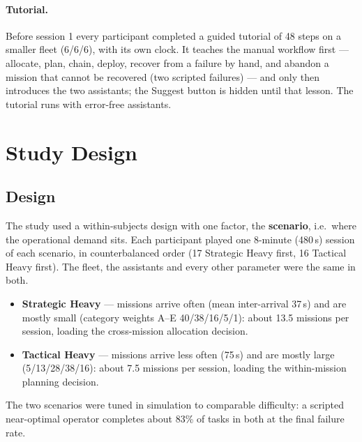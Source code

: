 \documentclass[10pt]{article}
\theoremstyle{definition}
\begin{document}
\paragraph{Tutorial.} Before session 1 every participant completed a guided tutorial of 48 steps on a smaller fleet
(6/6/6), with its own clock. It teaches the manual workflow first --- allocate, plan, chain, deploy, recover from a
failure by hand, and abandon a mission that cannot be recovered (two scripted failures) --- and only then introduces
the two assistants; the Suggest button is hidden until that lesson. The tutorial runs with error-free assistants.

\section{Study Design}\label{sec:studydesign}

\subsection{Design}\label{sec:design}

The study used a within-subjects design with one factor, the \textbf{scenario}, i.e.\ where the operational demand
sits. Each participant played one 8-minute (480\,s) session of each scenario, in counterbalanced order (17
Strategic Heavy first, 16 Tactical Heavy first). The fleet, the assistants and every other parameter were the same in
both.
\begin{itemize}[noitemsep]
  \item \textbf{Strategic Heavy} --- missions arrive often (mean inter-arrival 37\,s) and are mostly small (category
        weights A--E 40/38/16/5/1): about 13.5 missions per session, loading the cross-mission allocation decision.
  \item \textbf{Tactical Heavy} --- missions arrive less often (75\,s) and are mostly large (5/13/28/38/16): about
        7.5 missions per session, loading the within-mission planning decision.
\end{itemize}
The two scenarios were tuned in simulation to comparable difficulty: a scripted near-optimal operator completes about
83\% of tasks in both at the final failure rate.
\end{document}

